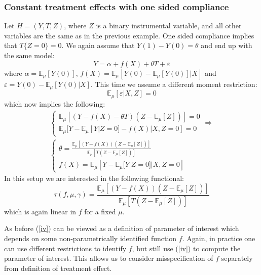 \documentclass[12pt]{article}
\theoremstyle{plain}
\begin{document}
\subsubsection{Constant treatment effects with one sided compliance}
Let $H = (Y, T, Z)$, where $Z$ is a binary instrumental variable, and all other variables are the same as in the previous example. One sided compliance implies that $T\{Z=0\} = 0$. We again assume that $Y(1)-Y(0) = \theta$ and end up with the same model:
\begin{equation}
Y = \alpha + f(X) + \theta T + \varepsilon
\end{equation}
where $\alpha = \mathbb{E}_{\mu}[Y(0)]$, $f(X) = \mathbb{E}_{\mu}[Y(0)-\mathbb{E}_{\mu}[Y(0)]|X]$ and $\varepsilon = Y(0) - \mathbb{E}_{\mu}[Y(0)|X]$. This time we assume a different moment restriction:
\begin{equation}\label{iv_res}
\mathbb{E}_{\mu}[\varepsilon|X,Z] = 0
\end{equation}
which now implies the following:
\begin{multline}\label{iv_mc}
\begin{cases}
\mathbb{E}_{\mu}[(Y-f(X)-\theta T)(Z-\mathbb{E}_{\mu}[Z])] = 0\\ 
\mathbb{E}_{\mu}[Y-\mathbb{E}_{\mu}[Y|Z=0]-f(X)|X, Z=0]=0
\end{cases} \Rightarrow\\
\begin{cases}
\theta = \frac{\mathbb{E}_{\mu}\left[(Y-f(X))(Z-\mathbb{E}_{\mu}[Z])\right]}{\mathbb{E}_{\mu}\left[T(Z-\mathbb{E}_{\mu}[Z])\right]} \\
f(X) = \mathbb{E}_{\mu}\left[Y-\mathbb{E}_{\mu}[Y|Z=0]|X, Z=0\right]
\end{cases}
\end{multline}
In this setup we are interested in the following functional:
\begin{equation}\label{iv}
\tau(f,\mu,\gamma) =  \frac{\mathbb{E}_{\mu}\left[(Y-f(X))(Z-\mathbb{E}_{\mu}[Z])\right]}{\mathbb{E}_{\mu}\left[T(Z-\mathbb{E}_{\mu}[Z])\right]} 
\end{equation}
which is again linear in $f$ for a fixed $\mu$.

As before (\ref{iv}) can be viewed as a definition of parameter of interest which depends on some non-parametrically identified function $f$. Again, in practice one can use different restrictions to identify $f$, but still use (\ref{iv}) to compute the parameter of interest. This allows us to consider misspecification of $f$ separately from definition of treatment effect. 
\end{document}
